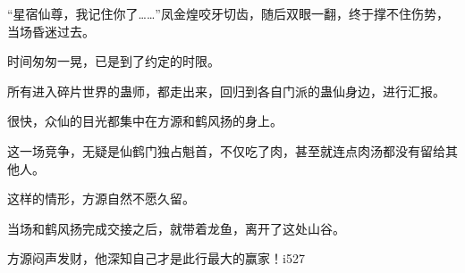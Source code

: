 \begin{this_body}
“星宿仙尊，我记住你了……”凤金煌咬牙切齿，随后双眼一翻，终于撑不住伤势，当场昏迷过去。

时间匆匆一晃，已是到了约定的时限。

所有进入碎片世界的蛊师，都走出来，回归到各自门派的蛊仙身边，进行汇报。

很快，众仙的目光都集中在方源和鹤风扬的身上。

这一场竞争，无疑是仙鹤门独占魁首，不仅吃了肉，甚至就连点肉汤都没有留给其他人。

这样的情形，方源自然不愿久留。

当场和鹤风扬完成交接之后，就带着龙鱼，离开了这处山谷。

方源闷声发财，他深知自己才是此行最大的赢家！i527

\end{this_body}

